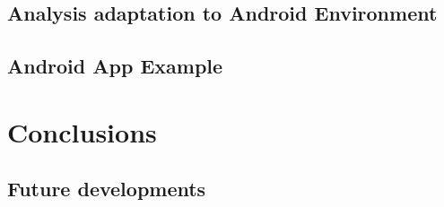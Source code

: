 \documentclass[letterpaper,twocolumn,10pt]{article}
\begin{document}
\subsection{Analysis adaptation to Android Environment}
\subsection{Android App Example}


\section{Conclusions}
\paragraph{}
\subsection{Future developments}


{\footnotesize 

}

\theendnotes

\end{document}
